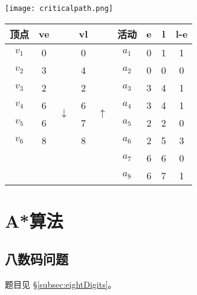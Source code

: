 \begin{center}
\texttt{[image: criticalpath.png]}\\
\label{fig:criticalpath}
\end{center}

\begin{center}
\label{tab:criticalpath}
\begin{tabular}{|ccccc|cccc|}
\hline
\textbf{顶点} & \textbf{ve} & & \textbf{vl} & & \textbf{活动} & \textbf{e} & \textbf{l} & \textbf{l-e} \\
\hline
$v_1$ & 0 & \multirow{8}{*}{$\downarrow$} & 0 & \multirow{8}{*}{$\uparrow$} & $a_1$ & 0 & 1 & 1 \\
$v_2$ & 3 &                               & 4 &                             & $a_2$ & 0 & 0 & 0 \\
$v_3$ & 2 &                               & 2 &                             & $a_3$ & 3 & 4 & 1 \\
$v_4$ & 6 &                               & 6 &                             & $a_4$ & 3 & 4 & 1 \\
$v_5$ & 6 &                               & 7 &                             & $a_5$ & 2 & 2 & 0 \\
$v_6$ & 8 &                               & 8 &                             & $a_6$ & 2 & 5 & 3 \\
      &   &                               &   &                             & $a_7$ & 6 & 6 & 0 \\
      &   &                               &   &                             & $a_8$ & 6 & 7 & 1 \\
\hline
\end{tabular}
\end{center}


\section{A*算法} %
\label{sec:astar}

\subsection{八数码问题}
题目见 \S \ref{subsec:eightDigits}。

